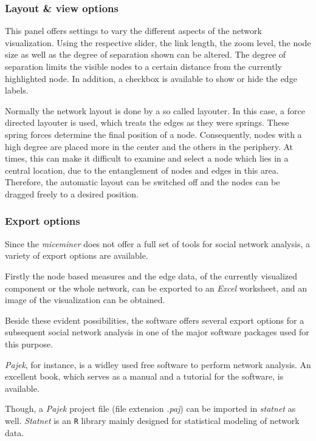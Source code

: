 \subsubsection*{Layout \& view options}

This panel offers settings to vary the different aspects of the network visualization. Using the respective slider, the link length, the zoom level, the node size as well as the degree of separation shown can be altered. The degree of separation limits the visible nodes to a certain distance from the currently highlighted node. In addition, a checkbox is available to show or hide the edge labels.

Normally the network layout is done by a so called layouter. In this case, a force directed layouter is used, which treats the edges as they were springs. These spring forces determine the final position of a node. Consequently, nodes with a high degree are placed more in the center and the others in the periphery. At times, this can make it difficult to examine and select a node which lies in a central location, due to the entanglement of nodes and edges in this area. Therefore, the automatic layout can be switched off and the nodes can be dragged freely to a desired position.

\subsubsection*{Export options} 
\label{subsubsec:export_options}

Since the \textit{miceminer} does not offer a full set of tools for social network analysis, a variety of export options are available.

Firstly the node based measures and the edge data, of the currently visualized component or the whole network, can be exported to an \textit{Excel} worksheet, and an image of the visualization can be obtained.

Beside these evident possibilities, the software offers several export options for a subsequent social network analysis in one of the major software packages used for this purpose.

\textit{Pajek}\cite{Pajek}, for instance, is a widley used free software to perform network analysis. An excellent book\cite{pajek:03}, which serves as a manual and a tutorial for the software, is available.

Though, a \textit{Pajek} project file (file extension \textit{.paj}) can be imported in \textit{statnet}\cite{statnet:03} as well. \textit{Statnet} is an \lstinline|R|\cite{r:05} library mainly designed for statistical modeling of network data.

